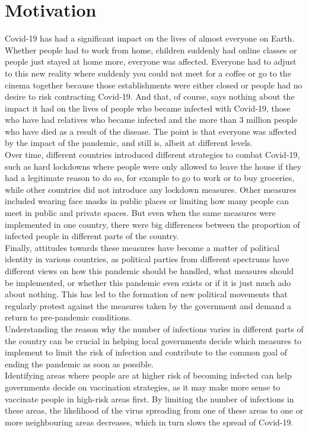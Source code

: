 \section{Motivation}
Covid-19 has had a significant impact on the lives of almost everyone on Earth. Whether people had to work from home, children suddenly had online classes or people just stayed at home more, everyone was affected. Everyone had to adjust to this new reality where suddenly you could not meet for a coffee or go to the cinema together because those establishments were either closed or people had no desire to risk contracting Covid-19. And that, of course, says nothing about the impact it had on the lives of people who became infected with Covid-19, those who have had relatives who became infected and the more than 3 million people who have died as a result of the disease. The point is that everyone was affected by the impact of the pandemic, and still is, albeit at different levels. \\
Over time, different countries introduced different strategies to combat Covid-19, such as hard lockdowns where people were only allowed to leave the house if they had a legitimate reason to do so, for example to go to work or to buy groceries, while other countries did not introduce any lockdown measures. Other measures included wearing face masks in public places or limiting how many people can meet in public and private spaces. But even when the same measures were implemented in one country, there were big differences between the proportion of infected people in different parts of the country. \\
Finally, attitudes towards these measures have become a matter of political identity in various countries, as political parties from different spectrums have different views on how this pandemic should be handled, what measures should be implemented, or whether this pandemic even exists or if it is just much ado about nothing. This has led to the formation of new political movements that regularly protest against the measures taken by the government and demand a return to pre-pandemic conditions. \\
Understanding the reason why the number of infections varies in different parts of the country can be crucial in helping local governments decide which measures to implement to limit the risk of infection and contribute to the common goal of ending the pandemic as soon as possible. \\
Identifying areas where people are at higher risk of becoming infected can help governments decide on vaccination strategies, as it may make more sense to vaccinate people in high-risk areas first. By limiting the number of infections in these areas, the likelihood of the virus spreading from one of these areas to one or more neighbouring areas decreases, which in turn slows the spread of Covid-19.
\clearpage
